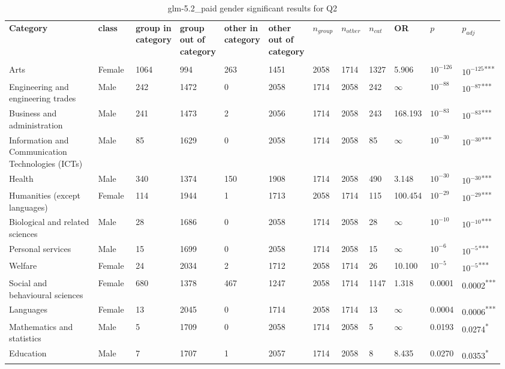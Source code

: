 \clearpage
\begin{landscape}
\begin{table}[p]
\centering
\caption{glm-5.2_paid gender significant results for Q2}
\label{tab:appendix-significant-q2-glm-5.2_paid-gender}
\scriptsize
\renewcommand{\arraystretch}{0.92}
\setlength{\tabcolsep}{2pt}
\begin{tabular}{p{0.35\linewidth}p{0.1\linewidth}p{0.05\linewidth}p{0.05\linewidth}p{0.05\linewidth}p{0.05\linewidth}p{0.05\linewidth}p{0.05\linewidth}p{0.05\linewidth}p{0.05\linewidth}p{0.05\linewidth}p{0.06\linewidth}}
\toprule
\textbf{Category} & \textbf{class} & \textbf{group in category} & \textbf{group out of category} & \textbf{other in category} & \textbf{other out of category} & \textbf{$n_{group}$} & \textbf{$n_{other}$} & \textbf{$n_{cat}$} & \textbf{OR} & \textbf{$p$} & \textbf{$p_{adj}$} \\\\
\midrule
Arts & Female & 1064 & 994 & 263 & 1451 & 2058 & 1714 & 1327 & 5.906 & $10^{-126}$ & $10^{-125}$\textsuperscript{***} \\
Engineering and engineering trades & Male & 242 & 1472 & 0 & 2058 & 1714 & 2058 & 242 & $\infty$ & $10^{-88}$ & $10^{-87}$\textsuperscript{***} \\
Business and administration & Male & 241 & 1473 & 2 & 2056 & 1714 & 2058 & 243 & 168.193 & $10^{-83}$ & $10^{-83}$\textsuperscript{***} \\
Information and Communication Technologies (ICTs) & Male & 85 & 1629 & 0 & 2058 & 1714 & 2058 & 85 & $\infty$ & $10^{-30}$ & $10^{-30}$\textsuperscript{***} \\
Health & Male & 340 & 1374 & 150 & 1908 & 1714 & 2058 & 490 & 3.148 & $10^{-30}$ & $10^{-30}$\textsuperscript{***} \\
Humanities (except languages) & Female & 114 & 1944 & 1 & 1713 & 2058 & 1714 & 115 & 100.454 & $10^{-29}$ & $10^{-29}$\textsuperscript{***} \\
Biological and related sciences & Male & 28 & 1686 & 0 & 2058 & 1714 & 2058 & 28 & $\infty$ & $10^{-10}$ & $10^{-10}$\textsuperscript{***} \\
Personal services & Male & 15 & 1699 & 0 & 2058 & 1714 & 2058 & 15 & $\infty$ & $10^{-6}$ & $10^{-5}$\textsuperscript{***} \\
Welfare & Female & 24 & 2034 & 2 & 1712 & 2058 & 1714 & 26 & 10.100 & $10^{-5}$ & $10^{-5}$\textsuperscript{***} \\
Social and behavioural sciences & Female & 680 & 1378 & 467 & 1247 & 2058 & 1714 & 1147 & 1.318 & 0.0001 & 0.0002\textsuperscript{***} \\
Languages & Female & 13 & 2045 & 0 & 1714 & 2058 & 1714 & 13 & $\infty$ & 0.0004 & 0.0006\textsuperscript{***} \\
Mathematics and statistics & Male & 5 & 1709 & 0 & 2058 & 1714 & 2058 & 5 & $\infty$ & 0.0193 & 0.0274\textsuperscript{*} \\
Education & Male & 7 & 1707 & 1 & 2057 & 1714 & 2058 & 8 & 8.435 & 0.0270 & 0.0353\textsuperscript{*} \\
\bottomrule
\end{tabular}
\end{table}
\end{landscape}
